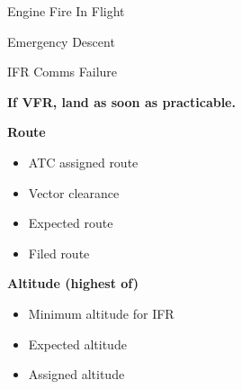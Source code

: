\begin{checklist_emerg}{Engine Fire In Flight}
\end{checklist_emerg}

\begin{checklist_emerg}{Emergency Descent}
    \begin{flushright}
    \end{flushright}
\end{checklist_emerg}

\begin{checklist_emerg}{IFR Comms Failure}

    \begin{center}
        \textbf{If VFR, land as soon as practicable.}
    \end{center}

    \textbf{Route}
    \begin{itemize}[noitemsep]
        \item ATC assigned route
        \item Vector clearance
        \item Expected route
        \item Filed route
    \end{itemize}

    \textbf{Altitude (highest of)}
    \begin{itemize}[noitemsep]
        \item Minimum altitude for IFR
        \item Expected altitude
        \item Assigned altitude
    \end{itemize}
\end{checklist_emerg}
